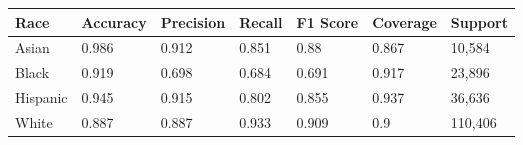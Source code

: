 \begin{tabular}{lllllll}
\toprule
Race & Accuracy & Precision & Recall & F1 Score & Coverage & Support \\
\midrule
Asian & 0.986 & 0.912 & 0.851 & 0.88 & 0.867 & 10,584 \\
Black & 0.919 & 0.698 & 0.684 & 0.691 & 0.917 & 23,896 \\
Hispanic & 0.945 & 0.915 & 0.802 & 0.855 & 0.937 & 36,636 \\
White & 0.887 & 0.887 & 0.933 & 0.909 & 0.9 & 110,406 \\
\bottomrule
\end{tabular}
